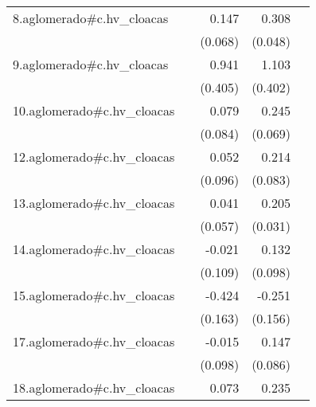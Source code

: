 {\begin{longtable}{l*{4}{D{.}{.}{-1}}}
\addlinespace
8.aglomerado#c.hv\_cloacas&                     &       0.147\sym{*}  &       0.308\sym{***}&                     \\
            &                     &     (0.068)         &     (0.048)         &                     \\
\addlinespace
9.aglomerado#c.hv\_cloacas&                     &       0.941\sym{*}  &       1.103\sym{**} &                     \\
            &                     &     (0.405)         &     (0.402)         &                     \\
\addlinespace
10.aglomerado#c.hv\_cloacas&                     &       0.079         &       0.245\sym{***}&                     \\
            &                     &     (0.084)         &     (0.069)         &                     \\
\addlinespace
12.aglomerado#c.hv\_cloacas&                     &       0.052         &       0.214\sym{*}  &                     \\
            &                     &     (0.096)         &     (0.083)         &                     \\
\addlinespace
13.aglomerado#c.hv\_cloacas&                     &       0.041         &       0.205\sym{***}&                     \\
            &                     &     (0.057)         &     (0.031)         &                     \\
\addlinespace
14.aglomerado#c.hv\_cloacas&                     &      -0.021         &       0.132         &                     \\
            &                     &     (0.109)         &     (0.098)         &                     \\
\addlinespace
15.aglomerado#c.hv\_cloacas&                     &      -0.424\sym{**} &      -0.251         &                     \\
            &                     &     (0.163)         &     (0.156)         &                     \\
\addlinespace
17.aglomerado#c.hv\_cloacas&                     &      -0.015         &       0.147         &                     \\
            &                     &     (0.098)         &     (0.086)         &                     \\
\addlinespace
18.aglomerado#c.hv\_cloacas&                     &       0.073         &       0.235\sym{***}&                     \\

\end{longtable}}
